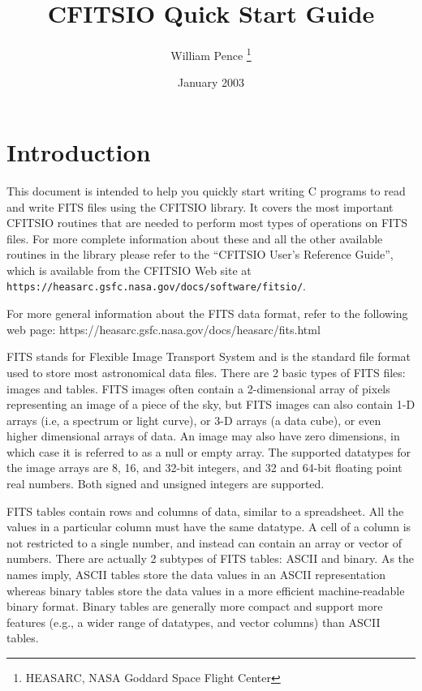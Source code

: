 \documentclass[11pt]{article}
\title{CFITSIO Quick Start Guide}
\author{William Pence \thanks{HEASARC, NASA Goddard Space Flight Center}}
\date{January 2003}
\begin{document}
\maketitle
\tableofcontents

\section{Introduction}

This document is intended to help you quickly start writing C programs
to read and write FITS files using the CFITSIO library.  It covers the
most important CFITSIO routines that are needed to perform most types
of operations on FITS files. For more complete information about these
and all the other available routines in the library please refer to
the  ``CFITSIO User's Reference Guide'', which is available from the
CFITSIO Web site at {\tt https://heasarc.gsfc.nasa.gov/docs/software/fitsio/}.

For more general information about the FITS data format, refer to the
following web page:
https://heasarc.gsfc.nasa.gov/docs/heasarc/fits.html

FITS stands for Flexible Image Transport System and is the standard
file format used to store most astronomical data files.  There are 2
basic types of FITS files: images and tables.  FITS images often
contain a 2-dimensional array of pixels representing an image of a
piece of the sky, but  FITS images can also contain 1-D arrays (i.e,
a spectrum or light curve), or  3-D arrays (a data cube), or
even higher dimensional arrays of data.   An image may also have zero
dimensions, in which case it is referred to as a null or empty array.
The supported datatypes for the image arrays are 8, 16, and 32-bit
integers, and 32 and 64-bit floating point real numbers.  Both signed
and unsigned integers are supported.

FITS tables contain rows and columns of data, similar to a
spreadsheet.  All the values in a particular column must have the same
datatype.  A cell of a column is not restricted to a single number, and
instead can contain an array or vector of numbers.  There are actually
2 subtypes of FITS tables: ASCII and binary. As the names imply,  ASCII
tables store the data values in an ASCII representation whereas binary
tables store the data values in a more efficient machine-readable
binary format.  Binary tables are generally more compact and support
more features (e.g., a wider range of datatypes, and vector columns)
than ASCII tables.
\end{document}
